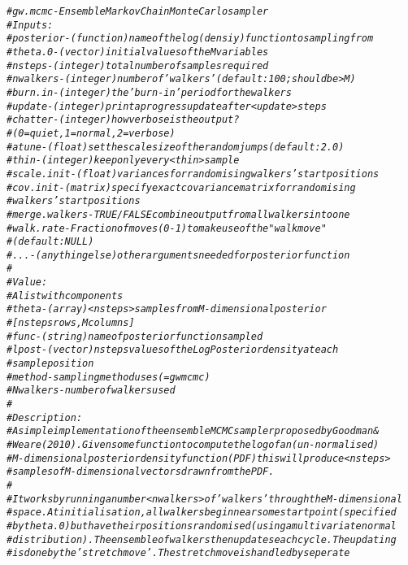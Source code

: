 \documentclass{article}\usepackage[]{graphicx}\usepackage[]{color}
\makeatletter
\newcommand{\hlcom}[1]{\textcolor[rgb]{0.678,0.584,0.686}{\textit{#1}}}%
\newenvironment{kframe}{%
 \def\at@end@of@kframe{}%
 \ifinner\ifhmode%
  \def\at@end@of@kframe{\end{minipage}}%
  \begin{minipage}{\columnwidth}%
 \fi\fi%
 \def\FrameCommand##1{\hskip\@totalleftmargin \hskip-\fboxsep
 \colorbox{shadecolor}{##1}\hskip-\fboxsep
     \hskip-\linewidth \hskip-\@totalleftmargin \hskip\columnwidth}%
 \MakeFramed {\advance\hsize-\width
   \@totalleftmargin\z@ \linewidth\hsize
   \@setminipage}}%
 {\par\unskip\endMakeFramed%
 \at@end@of@kframe}
\newenvironment{knitrout}{}{} %
\makeatother
\begin{document}
\begin{knitrout}
\begin{kframe}
\begin{alltt}
\hlcom{# gw.mcmc - Ensemble Markov Chain Monte Carlo sampler}
\hlcom{# Inputs: }
\hlcom{#   posterior  - (function) name of the log(densiy) function to sampling from}
\hlcom{#   theta.0    - (vector) initial values of the M variables}
\hlcom{#   nsteps     - (integer) total number of samples required}
\hlcom{#   nwalkers   - (integer) number of 'walkers' (default: 100; should be > M)}
\hlcom{#   burn.in    - (integer) the 'burn-in' period for the walkers}
\hlcom{#   update     - (integer) print a progress update after <update> steps}
\hlcom{#   chatter    - (integer) how verbose is the output? }
\hlcom{#                   (0=quiet, 1=normal, 2=verbose)}
\hlcom{#   atune      - (float) set the scale size of the random jumps (default: 2.0)}
\hlcom{#   thin       - (integer) keep only every <thin> sample}
\hlcom{#   scale.init - (float) variances for randomising walkers' start positions }
\hlcom{#   cov.init   - (matrix) specify exact covariance matrix for randomising }
\hlcom{#                    walkers' start positions }
\hlcom{#   merge.walkers - TRUE/FALSE combine output from all walkers into one}
\hlcom{#   walk.rate  - Fraction of moves (0-1) to make use of the "walk move" }
\hlcom{#                 (default: NULL)}
\hlcom{#   ...        - (anything else) other arguments needed for posterior function}
\hlcom{#}
\hlcom{# Value:}
\hlcom{#  A list with components}
\hlcom{#   theta     - (array) <nsteps> samples from M-dimensional posterior }
\hlcom{#                 [nsteps rows, M columns]}
\hlcom{#   func      - (string) name of posterior function sampled}
\hlcom{#   lpost     - (vector) nsteps values of the LogPosterior density at each }
\hlcom{#                 sample position }
\hlcom{#   method    - sampling method uses (=gwmcmc)}
\hlcom{#   Nwalkers  - number of walkers used}
\hlcom{#}
\hlcom{# Description:}
\hlcom{# A simple implementation of the ensemble MCMC sampler proposed by Goodman & }
\hlcom{# Weare (2010). Given some function to compute the log of an (un-normalised) }
\hlcom{# M-dimensional posterior density function (PDF) this will produce <nsteps> }
\hlcom{# samples of M-dimensional vectors drawn from the PDF.}
\hlcom{# }
\hlcom{# It works by running a number <nwalkers> of 'walkers' through the M-dimensional}
\hlcom{# space. At initialisation, all walkers begin near some start point (specified }
\hlcom{# by theta.0) but have their positions randomised (using a multivariate normal }
\hlcom{# distribution). The ensemble of walkers then updates each cycle. The updating }
\hlcom{# is done by the 'stretch move'. The stretch move is handled by seperate }

\end{alltt}
\end{kframe}
\end{knitrout}
\end{document}
